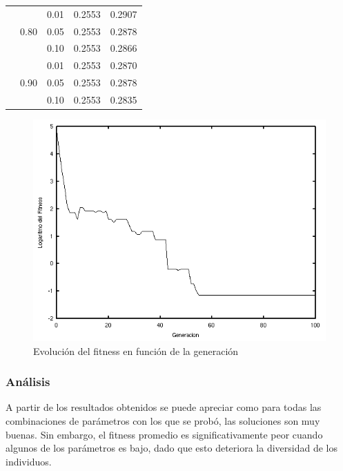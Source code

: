 \documentclass[journal]{IEEEtran}
\begin{document}
\begin{table}[h]
\begin{tabular}{|c|c|c||c|c|}
                    & \multirow{3}{*}{0.80} & 0.01 & 0.2553 & 0.2907 \\
                    &                       & 0.05 & 0.2553 & 0.2878 \\
                    &                       & 0.10 & 0.2553 & 0.2866 \\ \cline{2-5}
                    & \multirow{3}{*}{0.90} & 0.01 & 0.2553 & 0.2870 \\
                    &                       & 0.05 & 0.2553 & 0.2878 \\
                    &                       & 0.10 & 0.2553 & 0.2835 \\ \hline
\end{tabular}
\label{tab:tuning}
\end{table}

\begin{figure}[h]
\centering
\includegraphics[width=\linewidth]{evolution.png}
\caption{Evolución del fitness en función de la generación}
\label{fig:evolution}
\end{figure}

\subsubsection*{Análisis}

A partir de los resultados obtenidos se puede apreciar como para todas las combinaciones de parámetros con los que se probó, las soluciones son muy buenas. Sin embargo, el fitness promedio es significativamente peor cuando algunos de los parámetros es bajo, dado que esto deteriora la diversidad de los individuos.\\
\end{document}
